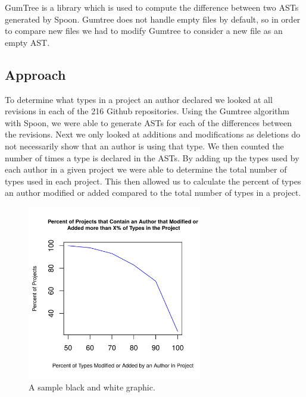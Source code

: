 \documentclass{sig-alternate-05-2015}
\begin{document}
GumTree \cite{falleri:hal-01054552} is a library which is used to compute the difference between two ASTs generated by Spoon. Gumtree does not handle empty files by default, so in order to compare new files we had to modify Gumtree to consider a new file as an empty AST.

\subsection{Approach}
To determine what types in a project an author declared we looked at all revisions in each of the 216 Github repositories. Using the Gumtree algorithm with Spoon, we were able to generate ASTs for each of the differences between the revisions. Next we only looked at additions and modifications as deletions do not necessarily show that an author is using that type. We then counted the number of times a type is declared in the ASTs. By adding up the types used by each author in a given project we were able to determine the total number of types used in each project. This then allowed us to calculate the percent of types an author modified or added compared to the total number of types in a project.

\begin{figure}[t]
\centering
\includegraphics[height=3in, width=3in]{../lib_stats_count_authors_percent_per_project}
\caption{A sample black and white graphic.}
\label{lib_stats_count_authors_percent_per_project}
\end{figure}
\end{document}
